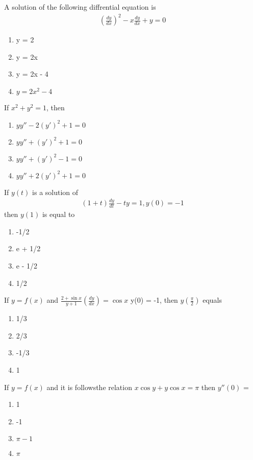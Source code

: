 \item A solution of the following diffrential equation is
\begin{align*}
\left(\frac{dy}{dx}\right)^{2} - x\frac{dy}{dx} + y = 0
\end{align*}
\begin{enumerate}
\item y = 2
\item y = 2x
\item y = 2x - 4
\item $y = 2x^2 - 4$
\end{enumerate}

\item If $x^2 + y^2 = 1$, then
\begin{enumerate}
\item $yy'' - 2(y')^{2} + 1 = 0$
\item $yy'' + (y')^{2} + 1 = 0$
\item $yy'' + (y')^{2} - 1 = 0$
\item $yy'' + 2(y')^{2} + 1 = 0$
\end{enumerate}

\item If $y(t)$ is a solution of
\begin{align*}
(1 + t)\frac{dy}{dt} - ty = 1, y(0) = -1
\end{align*}
then $y(1)$ is equal to
\begin{enumerate}
\item -1/2
\item e + 1/2
\item e - 1/2
\item 1/2
\end{enumerate}

\item If $y = f(x)$ and $\frac{2 + \sin x}{y + 1}\left(\frac{dy}{dx}\right) = \cos x$
y(0) = -1, then $y\left(\frac{\pi}{2}\right)$ equals
\begin{enumerate}
\item 1/3
\item 2/3
\item -1/3
\item 1
\end{enumerate}

\item If $y = f(x)$ and it is followsthe relation $x\cos y + y\cos x = \pi$ then $y''(0)$ = 
\begin{enumerate}
\item 1
\item -1
\item $\pi - 1$
\item $\pi$
\end{enumerate}


